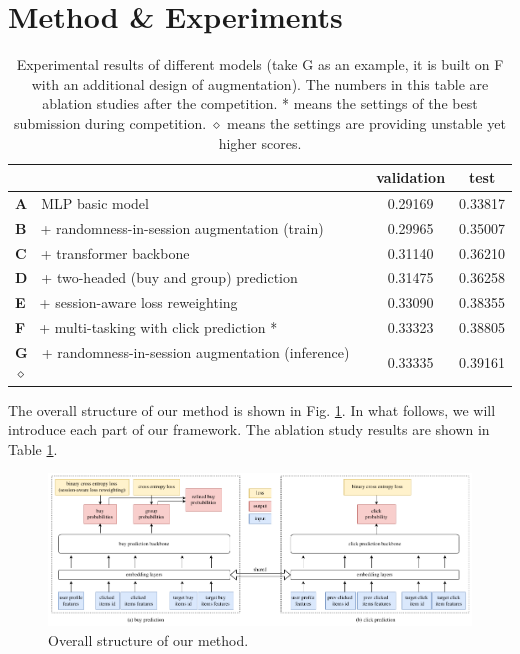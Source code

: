 \section{Method \& Experiments} \label{sec:method}

\begin{table}[t!]
    \centering
    \caption{Experimental results of different models (take G as an example, it is built on F with an additional design of augmentation). The numbers in this table are ablation studies after the competition. * means the settings of the best submission during competition. $\diamond$ means the settings are providing unstable yet higher scores.}
    \begin{tabular}{l|c|c}
         & validation & test \\\hline
        \textbf{A}~~MLP basic model & 0.29169 & 0.33817 \\
        \textbf{B}~~+ randomness-in-session augmentation (train) & 0.29965 & 0.35007 \\
        \textbf{C}~~+ transformer backbone & 0.31140 & 0.36210 \\
        \textbf{D}~~+ two-headed (buy and group) prediction & 0.31475 & 0.36258 \\
        \textbf{E}~~+ session-aware loss reweighting & 0.33090 & 0.38355 \\
        \textbf{F}~~+ multi-tasking with click prediction * & 0.33323 & 0.38805 \\
        \textbf{G}~~+ randomness-in-session augmentation (inference) $\diamond$ & 0.33335 & 0.39161 \\
    \end{tabular}
    \label{tab:ablation}
\end{table}

The overall structure of our method is shown in Fig. \ref{fig:net}. 
In what follows, we will introduce each part of our framework.
The ablation study results are shown in Table \ref{tab:ablation}.

\begin{figure}[htbp]
    \centering
    \includegraphics[width=\linewidth]{figures/net.pdf}
    \caption{Overall structure of our method.}
    \label{fig:net}
\end{figure}

